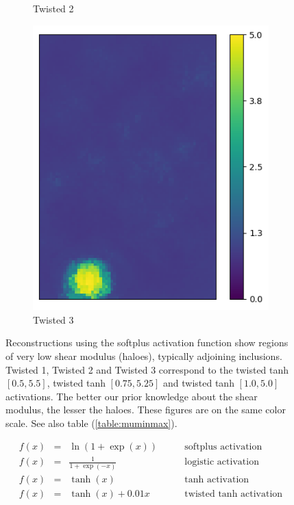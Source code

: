 \documentclass[12pt]{article}
\newcommand{\nhghaloesheight}{3.0cm}
\newcommand{\nhghaloeswidth}{0.19\linewidth}
\begin{document}
\begin{figure}[!h]
\begin{subfigure}[c]{\nhghaloeswidth}
    \caption{\label{fig:haloes_tanhp25} Twisted 2}        
  \end{subfigure}
  \begin{subfigure}[c]{\nhghaloeswidth}
    \centering
    \includegraphics[totalheight=\nhghaloesheight]{Figures/softplus_halos/ex1/mutanhshift0.png}
    \caption{\label{fig:haloes_tanhp0} Twisted 3}    
  \end{subfigure}     
  \caption{\label{fig:haloes} Reconstructions using the softplus activation function show regions of very low shear modulus (haloes), typically adjoining inclusions. Twisted 1, Twisted 2 and Twisted 3 correspond to the twisted tanh $[0.5, 5.5]$, twisted tanh $[0.75,5.25]$ and twisted tanh $[1.0,5.0]$ activations. The better our prior knowledge about the shear modulus, the lesser the haloes. These figures are on the same color scale. See also table (\ref{table:muminmax}).}
\end{figure}
% 
\begin{subequations}
\begin{align}
f(x) &= &\ln(1+\exp(x)) \qquad &\text{softplus activation}\label{eqn:softplus}\\
f(x) &= &\frac{1}{1+\exp(-x)} \qquad &\text{logistic activation} \label{eqn:logistic}\\
f(x) &= &\tanh(x) \qquad &\text{tanh activation} \label{eqn:tanh}\\
f(x) &= &\tanh(x) + 0.01x \qquad &\text{twisted tanh activation} \label{eqn:twisttanh}
\end{align}
\label{eqn:activations}
\end{subequations}
\end{document}
